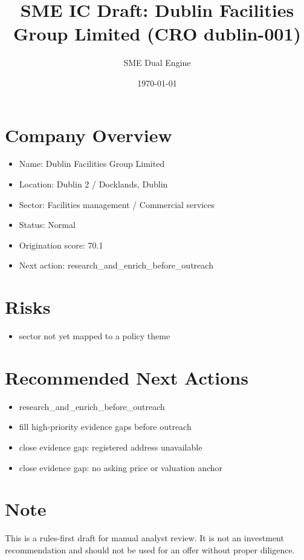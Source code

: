 \documentclass[11pt,a4paper]{article}
\title{SME IC Draft: Dublin Facilities Group Limited (CRO dublin-001)}
\author{SME Dual Engine}
\date{\today}
\begin{document}
\maketitle
\section*{Company Overview}
\begin{itemize}[leftmargin=1.4em]
\item Name: Dublin Facilities Group Limited
\item Location: Dublin 2 / Docklands, Dublin
\item Sector: Facilities management / Commercial services
\item Status: Normal
\item Origination score: 70.1
\item Next action: research\_and\_enrich\_before\_outreach
\end{itemize}
\section*{Risks}
\begin{itemize}[leftmargin=1.4em]
\item sector not yet mapped to a policy theme
\end{itemize}
\section*{Recommended Next Actions}
\begin{itemize}[leftmargin=1.4em]
\item research\_and\_enrich\_before\_outreach
\item fill high-priority evidence gaps before outreach
\item close evidence gap: registered address unavailable
\item close evidence gap: no asking price or valuation anchor
\end{itemize}
\section*{Note}
This is a rules-first draft for manual analyst review. It is not an investment
recommendation and should not be used for an offer without proper diligence.
\end{document}
